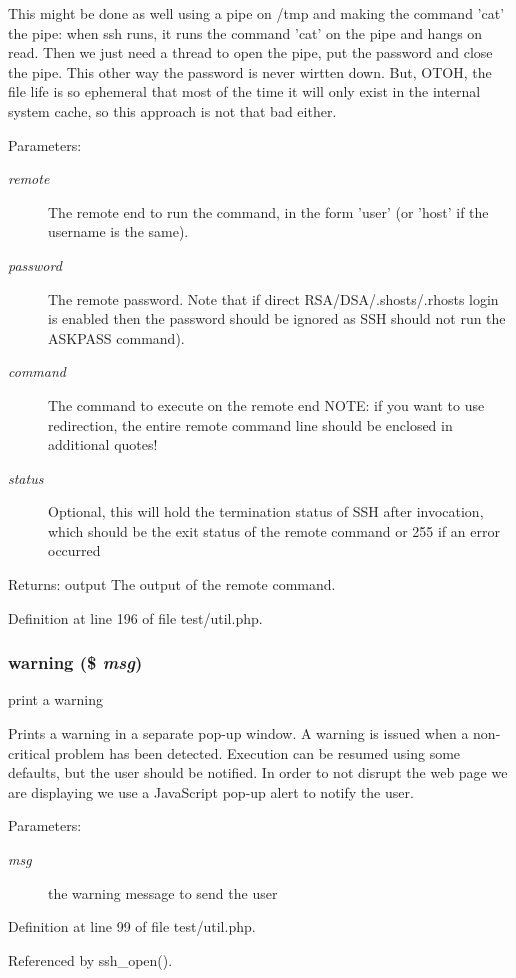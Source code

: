 This might be done as well using a pipe on /tmp and making the command 'cat' the pipe: when ssh runs, it runs the command 'cat' on the pipe and hangs on read. Then we just need a thread to open the pipe, put the password and close the pipe. This other way the password is never wirtten down. But, OTOH, the file life is so ephemeral that most of the time it will only exist in the internal system cache, so this approach is not that bad either.

\begin{Desc}
\item[Parameters:]
\begin{description}
\item[{\em remote}]The remote end to run the command, in the form 'user' (or 'host' if the username is the same). \item[{\em password}]The remote password. Note that if direct RSA/DSA/.shosts/.rhosts login is enabled then the password should be ignored as SSH should not run the ASKPASS command). \item[{\em command}]The command to execute on the remote end NOTE: if you want to use redirection, the entire remote command line should be enclosed in additional quotes! \item[{\em status}]Optional, this will hold the termination status of SSH after invocation, which should be the exit status of the remote command or 255 if an error occurred \end{description}
\end{Desc}
\begin{Desc}
\item[Returns:]output The output of the remote command. \end{Desc}


Definition at line 196 of file test/util.php.
\subsubsection{\setlength{\rightskip}{0pt plus 5cm}warning (\$ {\em msg})}\label{test_2util_8php_a2}


print a warning 

Prints a warning in a separate pop-up window. A warning is issued when a non-critical problem has been detected. Execution can be resumed using some defaults, but the user should be notified. In order to not disrupt the web page we are displaying we use a Java\-Script pop-up alert to notify the user.

\begin{Desc}
\item[Parameters:]
\begin{description}
\item[{\em msg}]the warning message to send the user \end{description}
\end{Desc}


Definition at line 99 of file test/util.php.

Referenced by ssh\_\-open().